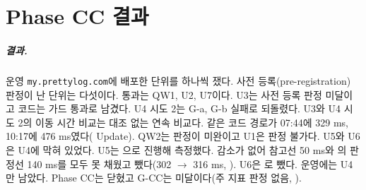 \chapter{Phase CC 결과}\label{ch:results}

\paragraph{결과.}
운영 \texttt{my.prettylog.com}에 배포한 단위를 하나씩 쟀다.
사전 등록(pre-registration) 판정이 난 단위는 다섯이다.
통과는 QW1, U2, U7이다. U3는 사전 등록 판정 미달이고 코드는 가드 통과로 남겼다. U4 시도 2는 G-a, G-b 실패로 되돌렸다.
U3와 U4 시도 2의 이동 시간 비교는 대조 없는 연속 비교다. 같은 코드 경로가 07:44에 329 ms, 10:17에 476 ms였다( Update).
QW2는 판정이 미완이고 U1은 판정 불가다.
U5와 U6은 U4에 막혀 있었다. U5는 으로 진행해 측정했다. 감소가 없어 참고선 50 ms와 의 판정선 140 ms를 모두 못 채웠고 뺐다(302 $\to$ 316 ms, ). U6은 로 뺐다.
운영에는 U4 만 남았다. Phase CC는 닫혔고 G-CC는 미달이다(주 지표 판정 없음, ).

